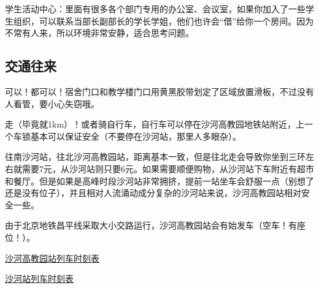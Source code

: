学生活动中心：里面有很多各个部门专用的办公室、会议室，如果你加入了一些学生组织，可以联系当部长副部长的学长学姐，他们也许会“借”给你一个房间。因为不常有人来，所以环境非常安静，适合思考问题。

\subsection{交通往来}


可以！都可以！宿舍门口和教学楼门口用黄黑胶带划定了区域放置滑板，不过没有人看管，要小心失窃哦。


走（毕竟就1km）！或者骑自行车，自行车可以停在沙河高教园地铁站附近，上一个车锁基本可以保证安全（不要停在沙河站，那里人多眼杂）。


往南沙河站，往北沙河高教园站，距离基本一致，但是往北走会导致你坐到三环左右就需要7元，从沙河站则只要6元。如果需要顺便购物，从沙河站下车附近有超市和餐厅。但是如果是高峰时段沙河站非常拥挤，提前一站坐车会舒服一点（别想了还是没有位子），并且相对人流涌动成分复杂的沙河站来说，沙河高教园站相对安全一些。

由于北京地铁昌平线采取大小交路运行，沙河高教园站会有始发车（空车！有座位！）。

\href{https://www.bjsubway.com/station/xltcx/linecp/2013-08-26/246.html?sk=1}{沙河高教园站列车时刻表}

\href{https://www.bjsubway.com/station/xltcx/linecp/2013-08-26/249.html?sk=1}{沙河站列车时刻表}

